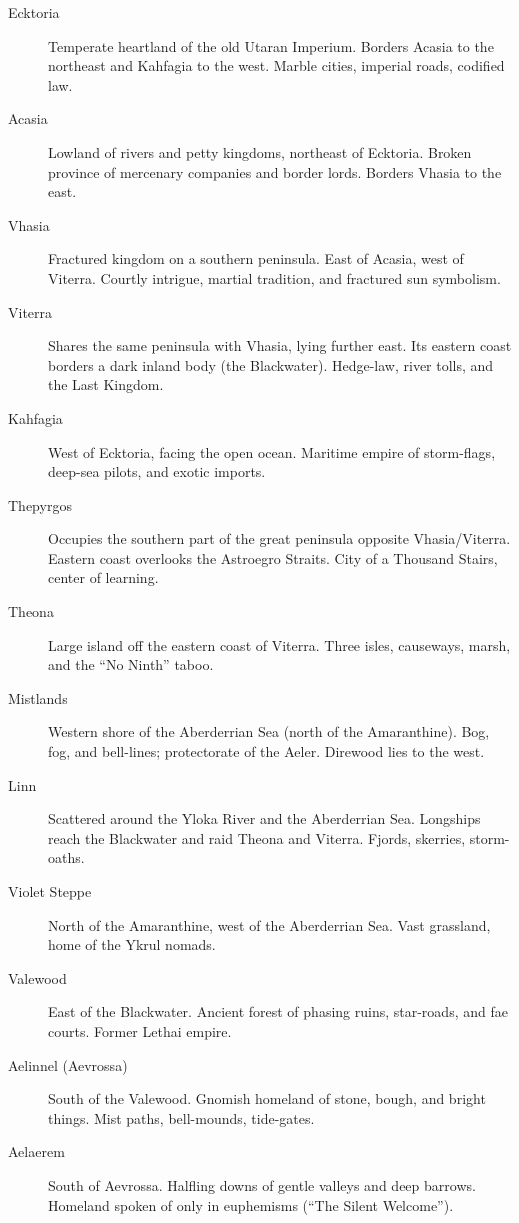 \begin{description}
  \item[Ecktoria]  Temperate heartland of the old Utaran Imperium. Borders Acasia to the northeast and Kahfagia to the west. Marble cities, imperial roads, codified law.
  \item[Acasia]  Lowland of rivers and petty kingdoms, northeast of Ecktoria. Broken province of mercenary companies and border lords. Borders Vhasia to the east.
  \item[Vhasia]  Fractured kingdom on a southern peninsula. East of Acasia, west of Viterra. Courtly intrigue, martial tradition, and fractured sun symbolism.
  \item[Viterra]  Shares the same peninsula with Vhasia, lying further east. Its eastern coast borders a dark inland body (the Blackwater). Hedge-law, river tolls, and the Last Kingdom.
  \item[Kahfagia]  West of Ecktoria, facing the open ocean. Maritime empire of storm-flags, deep-sea pilots, and exotic imports.
  \item[Thepyrgos]  Occupies the southern part of the great peninsula opposite Vhasia/Viterra. Eastern coast overlooks the Astroegro Straits. City of a Thousand Stairs, center of learning.
  \item[Theona]  Large island off the eastern coast of Viterra. Three isles, causeways, marsh, and the ``No Ninth'' taboo.
  \item[Mistlands]  Western shore of the Aberderrian Sea (north of the Amaranthine). Bog, fog, and bell-lines; protectorate of the Aeler. Direwood lies to the west.
  \item[Linn]  Scattered around the Yloka River and the Aberderrian Sea. Longships reach the Blackwater and raid Theona and Viterra. Fjords, skerries, storm-oaths.
  \item[Violet Steppe]  North of the Amaranthine, west of the Aberderrian Sea. Vast grassland, home of the Ykrul nomads.
  \item[Valewood]  East of the Blackwater. Ancient forest of phasing ruins, star-roads, and fae courts. Former Lethai empire.
  \item[Aelinnel (Aevrossa)]  South of the Valewood. Gnomish homeland of stone, bough, and bright things. Mist paths, bell-mounds, tide-gates.
  \item[Aelaerem]  South of Aevrossa. Halfling downs of gentle valleys and deep barrows. Homeland spoken of only in euphemisms (``The Silent Welcome'').

\end{description}
